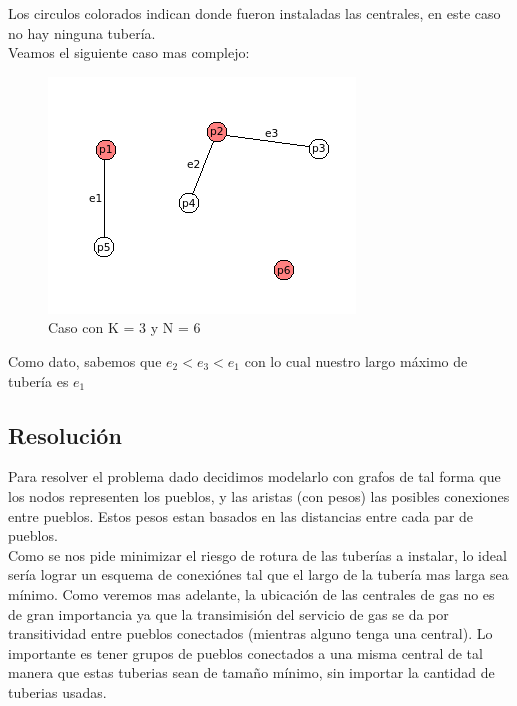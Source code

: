 Los circulos colorados indican donde fueron instaladas las centrales, en este caso no hay ninguna tuber\'ia.\\

Veamos el siguiente caso mas complejo: 

\begin{figure}[h]
\begin{center}
\includegraphics[scale=0.7]{./img/ej2_explicacion2.png}
\caption{Caso con K = 3 y N = 6}
\end{center}
\end{figure}

Como dato, sabemos que $e_2 < e_3 < e_1$ con lo cual nuestro largo m\'aximo de tuber\'ia es $e_1$

\subsection{Resoluci\'on}

Para resolver el problema dado decidimos modelarlo con grafos de tal forma que los nodos representen los pueblos, y las aristas (con pesos) las posibles conexiones entre pueblos. Estos pesos estan basados en las distancias entre cada par de pueblos. \\

Como se nos pide minimizar el riesgo de rotura de las tuber\'ias a instalar, lo ideal ser\'ia lograr un esquema de conexi\'ones tal que el largo de la tuber\'ia mas larga sea m\'inimo. Como veremos mas adelante, la ubicaci\'on de las centrales de gas no es de gran importancia ya que la transimisi\'on del servicio de gas se da por transitividad entre pueblos conectados (mientras alguno tenga una central). Lo importante es tener grupos de pueblos conectados a una misma central de tal manera que estas tuberias sean de tama\~no m\'inimo, sin importar la cantidad de tuberias usadas. \\

